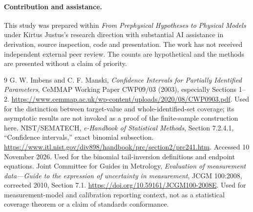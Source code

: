 \documentclass[11pt]{article}
\begin{document}
\paragraph{Contribution and assistance.}
This study was prepared within \emph{From Prephysical Hypotheses to Physical Models} under Kirtus Justus's research direction with substantial AI assistance in derivation, source inspection, code and presentation. The work has not received independent external peer review. The counts are hypothetical and the methods are presented without a claim of priority.

\clearpage
\begin{thebibliography}{9}
 G. W. Imbens and C. F. Manski, \emph{Confidence Intervals for Partially Identified Parameters}, CeMMAP Working Paper CWP09/03 (2003), especially Sections 1--2. \url{https://www.cemmap.ac.uk/wp-content/uploads/2020/08/CWP0903.pdf}. Used for the distinction between target-value and whole-identified-set coverage; its asymptotic results are not invoked as a proof of the finite-sample construction here.
 NIST/SEMATECH, \emph{e-Handbook of Statistical Methods}, Section 7.2.4.1, ``Confidence intervals,'' exact binomial subsection. \url{https://www.itl.nist.gov/div898/handbook/prc/section2/prc241.htm}. Accessed 10 November 2026. Used for the binomial tail-inversion definitions and endpoint equations.
 Joint Committee for Guides in Metrology, \emph{Evaluation of measurement data---Guide to the expression of uncertainty in measurement}, JCGM 100:2008, corrected 2010, Section 7.1. \url{https://doi.org/10.59161/JCGM100-2008E}. Used for measurement-model and calibration reporting context, not as a statistical coverage theorem or a claim of standards conformance.
\end{thebibliography}
\end{document}
